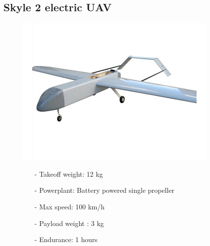 \documentclass{article}
\begin{document}
\subsection{Skyle 2 electric UAV}
\begin{figure}[h]
    \begin{minipage}[b]{.45\linewidth}
        \centering
        \includegraphics[width=0.7\linewidth]{Aircraft pics/Skyeye.png}
    \end{minipage}\hfill
    \begin{minipage}[b]{0.45\linewidth}
        \begin{itemize}
            \item [-] Takeoff weight: 12 kg
            \item [-] Powerplant: Battery powered single propeller
            \item [-] Max speed: 100 km/h 
            \item [-] Payload weight : 3 kg
            \item [-] Endurance: 1 hours
        \end{itemize}
    \end{minipage}
\end{figure}

\vspace{\fill}
\end{document}

